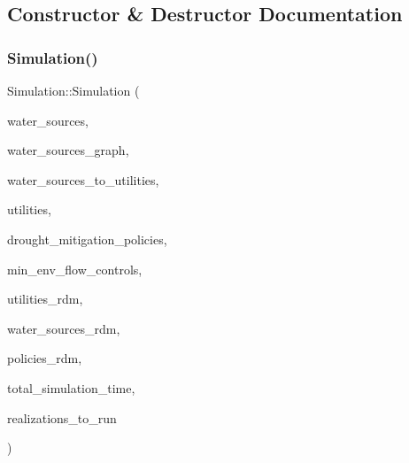 \subsection{Constructor \& Destructor Documentation}
\mbox{\label{classSimulation_ac9b9db9c3de5f9ff33f6ea89e2435c87}} 
\subsubsection{\texorpdfstring{Simulation()}{Simulation()}\hspace{0.1cm}{\footnotesize\ttfamily [1/3]}}
{\footnotesize\ttfamily Simulation\+::\+Simulation (\begin{DoxyParamCaption}\item[{vector$<$ \mbox{\hyperlink{classWaterSource}{Water\+Source}} $\ast$$>$ \&}]{water\+\_\+sources,  }\item[{\mbox{\hyperlink{classGraph}{Graph}} \&}]{water\+\_\+sources\+\_\+graph,  }\item[{const vector$<$ vector$<$ int $>$$>$ \&}]{water\+\_\+sources\+\_\+to\+\_\+utilities,  }\item[{vector$<$ \mbox{\hyperlink{classUtility}{Utility}} $\ast$$>$ \&}]{utilities,  }\item[{const vector$<$ \mbox{\hyperlink{classDroughtMitigationPolicy}{Drought\+Mitigation\+Policy}} $\ast$$>$ \&}]{drought\+\_\+mitigation\+\_\+policies,  }\item[{vector$<$ \mbox{\hyperlink{classMinEnvFlowControl}{Min\+Env\+Flow\+Control}} $\ast$$>$ \&}]{min\+\_\+env\+\_\+flow\+\_\+controls,  }\item[{vector$<$ vector$<$ double $>$$>$ \&}]{utilities\+\_\+rdm,  }\item[{vector$<$ vector$<$ double $>$$>$ \&}]{water\+\_\+sources\+\_\+rdm,  }\item[{vector$<$ vector$<$ double $>$$>$ \&}]{policies\+\_\+rdm,  }\item[{const unsigned long}]{total\+\_\+simulation\+\_\+time,  }\item[{vector$<$ unsigned long $>$ \&}]{realizations\+\_\+to\+\_\+run }\end{DoxyParamCaption})}

\mbox{\label{classSimulation_aa225c1836ebd788eb0f35c8cd53f0533}} 
